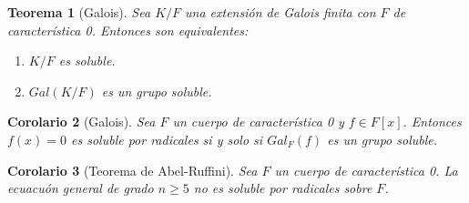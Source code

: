 \documentclass{report}
\newtheorem{theorem}{Teorema}[chapter]
\newtheorem{corollary}[theorem]{Corolario}
\theoremstyle{remark}
\theoremstyle{definition}
\theoremstyle{definition}
\theoremstyle{definition}
\begin{document}
\begin{theorem}[Galois]
    Sea $K/F$ una extensión de Galois finita con $F$ de característica 0. Entonces son equivalentes:
    \begin{enumerate}
        \item $K/F$ es soluble.
        \item $Gal(K/F)$ es un grupo soluble.
    \end{enumerate}
\end{theorem}

\begin{corollary}[Galois]
    Sea $F$ un cuerpo de característica 0 y $f \in F[x]$.
    Entonces $f(x) = 0$ es soluble por radicales si y solo si $Gal_F(f)$ es un grupo soluble.
\end{corollary}

\begin{corollary}[Teorema de Abel-Ruffini]
    Sea $F$ un cuerpo de característica 0.
    La ecuacuón general de grado $n \geq 5$ no es soluble por radicales sobre $F$.
\end{corollary}
\end{document}
